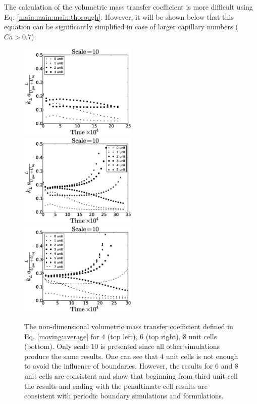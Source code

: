 \documentclass[preprint,12pt]{elsarticle}
\begin{document}
The calculation of the  volumetric mass transfer coefficient is more difficult
using Eq. \ref{main:main:main:thorough}. However, it will be shown below that
this equation can be significantly simplified in case of larger capillary
numbers ($Ca>0.7$).

\begin{figure}[htb!]
\includegraphics[width=0.5\textwidth]{Figures/aver_moving_window4scale10.eps}
\includegraphics[width=0.5\textwidth]{Figures/aver_moving_window6scale10.eps}\\
\includegraphics[width=0.5\textwidth]{Figures/aver_moving_window8scale10.eps}
\caption{The non-dimensional volumetric mass transfer coefficient defined in Eq.
\ref{moving:average} for $4$ (top left), $6$ (top right), $8$ unit cells (bottom). Only scale
$10$ is presented since all other simulations produce the same results. One can see that $4$ unit
cells is not enough to avoid the influence of boundaries. However, the results for $6$ and $8$
unit cells are consistent and show that beginning from third unit cell the results and ending with
the penultimate cell results are consistent with periodic boundary simulations and
\citet{vanbaten-circular} formulations.
\label{fig:moving:average:ca0097}}
\end{figure}
\end{document}
